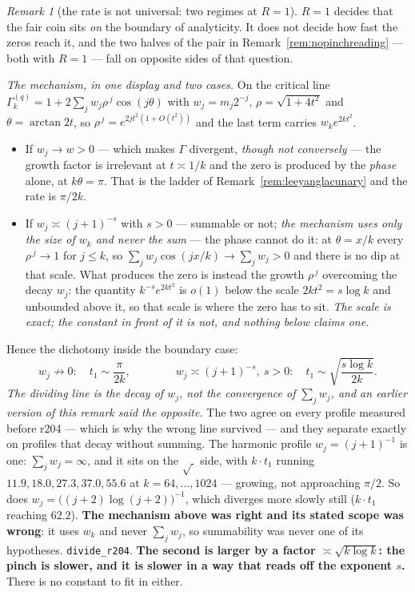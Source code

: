 \documentclass[11pt,a4paper]{article}
\theoremstyle{plain}
\theoremstyle{definition}
\theoremstyle{remark}
\newtheorem{remark}[theorem]{Remark}
\begin{document}
\begin{remark}[the rate is not universal: two regimes at $R=1$]\label{rem:rateregimes}
$R=1$ decides that the fair coin sits \emph{on} the boundary of analyticity. It does not decide
how fast the zeros reach it, and the two halves of the pair in
Remark~\ref{rem:nopinchreading} --- both with $R=1$ --- fall on opposite sides of that question.

\emph{The mechanism, in one display and two cases.} On the critical line
$\Gamma^{(q)}_k=1+2\sum_j w_j\rho^{\,j}\cos(j\theta)$ with $w_j=m_j2^{-j}$,
$\rho=\sqrt{1+4t^{2}}$ and $\theta=\arctan2t$, so $\rho^{\,j}=e^{2jt^{2}(1+O(t^{2}))}$ and the
last term carries $w_k e^{2kt^{2}}$.
\begin{itemize}
\item If $w_j\to w>0$ --- which makes $\Gamma$ divergent, \emph{though not conversely} --- the
      growth factor is irrelevant at $t\asymp1/k$ and the zero is produced by the \emph{phase}
      alone, at $k\theta=\pi$. That is the ladder of Remark~\ref{rem:leeyanglacunary} and the rate
      is $\pi/2k$.
\item If $w_j\asymp(j+1)^{-s}$ with $s>0$ --- summable or not; \emph{the mechanism uses only the
      size of $w_k$ and never the sum} --- the phase cannot do it:
      at $\theta=x/k$ every $\rho^{\,j}\to1$ for $j\le k$, so
      $\sum_j w_j\cos(jx/k)\to\sum_j w_j>0$ and there is no dip at that scale. What produces the
      zero is instead the growth $\rho^{\,j}$ overcoming the decay $w_j$: the quantity
      $k^{-s}e^{2kt^{2}}$ is $o(1)$ below the scale $2kt^{2}=s\log k$ and unbounded above it, so
      that scale is where the zero has to sit. \emph{The scale is exact; the constant in front of
      it is not, and nothing below claims one.}
\end{itemize}
Hence the dichotomy inside the boundary case:
\[
  w_j\not\to0:\quad t_1\sim\frac{\pi}{2k},
  \qquad\qquad
  w_j\asymp(j+1)^{-s},\ s>0:\quad t_1\sim\sqrt{\frac{s\log k}{2k}} .
\]
\emph{The dividing line is the decay of $w_j$, not the convergence of $\sum_j w_j$, and an
earlier version of this remark said the opposite.} The two agree on every profile measured before
r204 --- which is why the wrong line survived --- and they separate exactly on profiles that decay
without summing. The harmonic profile $w_j=(j+1)^{-1}$ is one: $\sum_j w_j=\infty$, and it sits on
the $\sqrt{\ }$ side, with $k\cdot t_1$ running $11.9, 18.0, 27.3, 37.0, 55.6$ at
$k=64,\dots,1024$ --- growing, not approaching $\pi/2$. So does $w_j=\bigl((j+2)\log(j+2)\bigr)^{-1}$,
which diverges more slowly still ($k\cdot t_1$ reaching $62.2$). \textbf{The mechanism above was
right and its stated scope was wrong}: it uses $w_k$ and never $\sum_j w_j$, so summability was
never one of its hypotheses. \texttt{divide\_r204}.
\textbf{The second is larger by a factor $\asymp\sqrt{k\log k}$: the pinch is slower, and it is
slower in a way that reads off the exponent $s$.} There is no constant to fit in either.


\end{remark}
\end{document}

